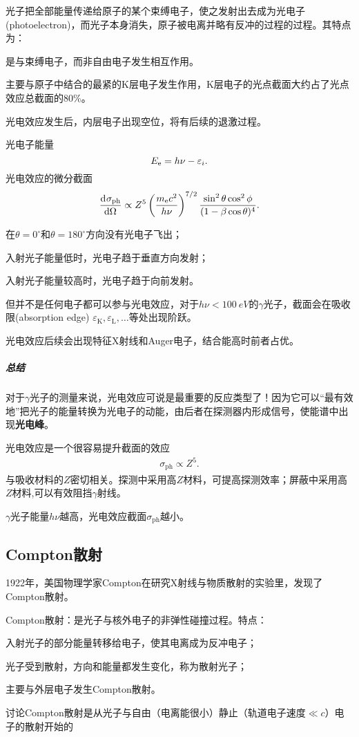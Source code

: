 光子把全部能量传递给原子的某个束缚电子，使之发射出去成为光电子(photoelectron)，而光子本身消失，原子被电离并略有反冲的过程的过程。其特点为：
\begin{compactenum}
	\item 是与束缚电子，而非自由电子发生相互作用。
	\item 主要与原子中结合的最紧的K层电子发生作用，K层电子的光点截面大约占了光点效应总截面的80\%。
	\item 光电效应发生后，内层电子出现空位，将有后续的退激过程。
\end{compactenum}
光电子能量 
\[
	E_\mathrm e=h\nu-\varepsilon_i.
\]
光电效应的微分截面
\[
	\frac{\mathrm{d}^{{}}\sigma_{\mathrm{ph}}}{\mathrm{d}{\Omega}^{{}}}\propto Z^5\left(\frac{m_\mathrm e c^2}{h\nu}\right)^{7/2}\frac{\sin^2\theta\cos^2\phi}{(1-\beta\cos\theta)^4}.
\]
\begin{compactenum}
	\item 在$\theta=0^\circ$和$\theta=180^\circ$方向没有光电子飞出；
	\item 入射光子能量低时，光电子趋于垂直方向发射；
	\item 入射光子能量较高时，光电子趋于向前发射。
\end{compactenum}

但并不是任何电子都可以参与光电效应，对于$h\nu<\SI{100}{eV}$的$\gamma$光子，截面会在吸收限(absorption edge) $\varepsilon_\mathrm K,\varepsilon_\mathrm L,\ldots$等处出现阶跃。

光电效应后续会出现特征X射线和Auger电子，结合能高时前者占优。

\subparagraph{总结}
对于$\gamma$光子的测量来说，光电效应可说是最重要的反应类型了！因为它可以“最有效地”把光子的能量转换为光电子的动能，由后者在探测器内形成信号，使能谱中出现\textbf{光电峰}。

光电效应是一个很容易提升截面的效应
\begin{align}
	\sigma_{\mathrm{ph}}\propto Z^5.
\end{align}
与吸收材料的$Z$密切相关。探测中采用高$Z$材料，可提高探测效率；屏蔽中采用高$Z$材料,可以有效阻挡$\gamma$射线。

$\gamma$光子能量$h\nu$越高，光电效应截面$\sigma_{\mathrm{ph}}$越小。

\subsection{Compton散射}

1922年，美国物理学家Compton在研究X射线与物质散射的实验里，发现了Compton散射。

Compton散射：是光子与核外电子的非弹性碰撞过程。特点：
\begin{compactenum}
	\item 入射光子的部分能量转移给电子，使其电离成为反冲电子；
	\item 光子受到散射，方向和能量都发生变化，称为散射光子；
	\item 主要与外层电子发生Compton散射。
\end{compactenum}
讨论Compton散射是从光子与自由（电离能很小）静止（轨道电子速度$\ll c$）电子的散射开始的
